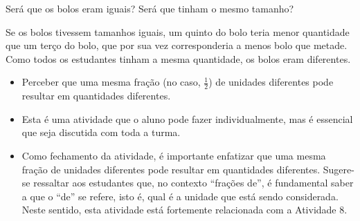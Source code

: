 \begin{multicols}{2}
\begin{orientacoes}
\begin{itemize}
Será que os bolos eram iguais? Será que tinham o mesmo tamanho? 
\end{itemize}
\end{orientacoes}

\begin{solucao}{}{}
  Se os bolos tivessem tamanhos iguais, um quinto do bolo teria menor quantidade que um terço do bolo, que por sua vez corresponderia a menos bolo que metade. Como todos os estudantes tinham a mesma quantidade, os bolos eram diferentes.

  \end{solucao}


\begin{objetivos}[label=chap2-ativ14]{}{}
  \begin{itemize} %
    \item       Perceber que uma mesma fração (no caso, $\frac{1}{2}$) de unidades diferentes pode resultar em quantidades diferentes.
\end{itemize} %
\end{objetivos}

\begin{orientacoes}
  \begin{itemize} %
    \item       Esta é uma atividade que o aluno pode fazer individualmente, mas é essencial que seja discutida com toda a turma.
    \item       Como fechamento da atividade, é importante enfatizar que  uma mesma fração de unidades diferentes pode resultar em quantidades diferentes. Sugere-se ressaltar aos estudantes que, no contexto ``frações de'', é fundamental saber a que o ``de'' se refere, isto é, qual é a unidade que está sendo considerada. Neste sentido, esta atividade está fortemente relacionada com a Atividade 8.
\end{itemize} %


\end{orientacoes}


\end{multicols}
